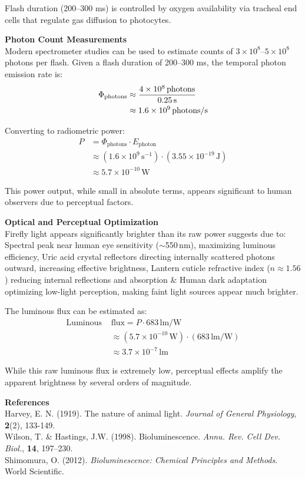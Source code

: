 \begin{technical}
Flash duration (200–300 ms) is controlled by oxygen availability via tracheal end cells that regulate gas diffusion to photocytes.

\noindent\textbf{Photon Count Measurements}\\
Modern spectrometer studies can be used to estimate counts of 
$3 \times 10^8$–$5 \times 10^8$ photons per flash. Given a flash duration of 200–300 ms, the temporal photon emission rate is:
\begin{align}
\Phi_{\text{photons}} &\approx 
\frac{4 \times 10^8\,\text{photons}}{0.25\,\text{s}} \notag\\
&\approx 1.6 \times 10^9\,\text{photons/s}
\end{align}

Converting to radiometric power:
\begin{align*}
P &= \Phi_{\text{photons}} \cdot E_{\text{photon}} \\
  &\approx (1.6 \times 10^9\,\text{s}^{-1}) \cdot (3.55 \times 10^{-19}\,\text{J}) \\
  &\approx 5.7 \times 10^{-10}\,\text{W}
\end{align*}

This power output, while small in absolute terms, appears significant to human observers due to perceptual factors.
\vspace{0.5em}

\noindent\textbf{Optical and Perceptual Optimization}\\
Firefly light appears significantly brighter than its raw power suggests due to: Spectral peak near human eye sensitivity ($\sim$550$\,\text{nm}$), maximizing luminous efficiency, Uric acid crystal reflectors directing internally scattered photons outward, increasing effective brightness, Lantern cuticle refractive index ($n \approx 1.56$) reducing internal reflections and absorption \& Human dark adaptation optimizing low-light perception, making faint light sources appear much brighter.

The luminous flux can be estimated as:
\begin{align*}
\text{Luminous }&\text{flux} = P \cdot 683\,\text{lm/W} \\
&\approx (5.7 \times 10^{-10}\,\text{W}) \cdot (683\,\text{lm/W}) \\
&\approx 3.7 \times 10^{-7}\,\text{lm}
\end{align*}

While this raw luminous flux is extremely low, perceptual effects amplify the apparent brightness by several orders of magnitude. 

\vspace{0.5em}
\noindent\textbf{References}\\
Harvey, E. N. (1919). The nature of animal light. \textit{Journal of General Physiology}, \textbf{2}(2), 133-149.\\
Wilson, T. \& Hastings, J.W. (1998). Bioluminescence. \textit{Annu. Rev. Cell Dev. Biol.}, \textbf{14}, 197--230.\\
Shimomura, O. (2012). \textit{Bioluminescence: Chemical Principles and Methods}. World Scientific.\\
\end{technical}